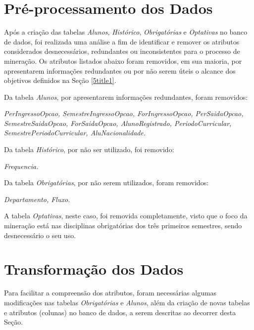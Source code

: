 \section{Pré-processamento dos Dados} \label{5subtitle2}

Após a criação das tabelas \textit{Alunos}, \textit{Histórico}, \textit{Obrigatórias} e \textit{Optativas} no banco de dados, foi realizada uma análise a fim de identificar e remover os atributos considerados desnecessários, redundantes ou inconsistentes para o processo de mineração. Os atributos listados abaixo foram removidos, em sua maioria, por apresentarem informações redundantes ou por não serem úteis o alcance dos objetivos definidos na Seção \ref{5title1}.

Da tabela \textit{Alunos}, por apresentarem informações redundantes, foram removidos:
\begin{center}
	\textit{PerIngressoOpcao, SemestreIngressoOpcao, ForIngressoOpcao, PerSaidaOpcao, SemestreSaidaOpcao, ForSaidaOpcao, AlunoRegistrado, PeriodoCurricular, SemestrePeriodoCurricular, AluNacionalidade.}
\end{center}


Da tabela \textit{Histórico}, por não ser utilizado, foi removido:

\begin{center}
 \textit{Frequencia.}
\end{center}


Da tabela \textit{Obrigatórias}, por não serem utilizados, foram removidos:

\begin{center}
	\textit{Departamento, Fluxo.}
\end{center}


A tabela \textit{Optativas}, neste caso, foi removida completamente, visto que o foco da mineração está nas disciplinas obrigatórias dos três primeiros semestres, sendo desnecessário o seu uso.


\section{Transformação dos Dados} \label{5subtitle3}

Para facilitar a compreensão dos atributos, foram necessárias algumas modificações nas tabelas \textit{Obrigatórias} e \textit{Alunos}, além da criação de novas tabelas e atributos (colunas) no banco de dados, a serem descritas ao decorrer desta Seção.

